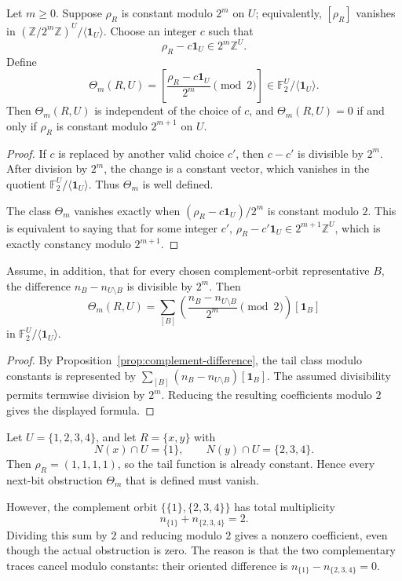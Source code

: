 \documentclass[thmsec,dntnbr,nolinenbrs]{dmgt}
\numberwithin{equation}{section}
\newcommand{\F}{\mathbb{F}}
\newcommand{\Z}{\mathbb{Z}}
\newcommand{\one}{\mathbf{1}}
\begin{document}
\begin{corollary}\label{cor:next-bit}
Let \(m\ge 0\).  Suppose \(\rho_R\) is constant modulo \(2^m\) on \(U\); equivalently, \([\rho_R]\) vanishes in \((\Z/2^m\Z)^U/\langle \one_U\rangle\).  Choose an integer \(c\) such that
\[
        \rho_R-c\one_U\in 2^m\Z^U.
\]
Define
\[
        \Theta_m(R,U)
        =\left[\frac{\rho_R-c\one_U}{2^m}\pmod 2\right]
        \in \F_2^U/\langle \one_U\rangle .
\]
Then \(\Theta_m(R,U)\) is independent of the choice of \(c\), and \(\Theta_m(R,U)=0\) if and only if \(\rho_R\) is constant modulo \(2^{m+1}\) on \(U\).
\end{corollary}

\begin{proof}
If \(c\) is replaced by another valid choice \(c'\), then \(c-c'\) is divisible by \(2^m\).  After division by \(2^m\), the change is a constant vector, which vanishes in the quotient \(\F_2^U/\langle \one_U\rangle\).  Thus \(\Theta_m\) is well defined.

The class \(\Theta_m\) vanishes exactly when \((\rho_R-c\one_U)/2^m\) is constant modulo \(2\).  This is equivalent to saying that for some integer \(c'\), \(\rho_R-c'\one_U\in 2^{m+1}\Z^U\), which is exactly constancy modulo \(2^{m+1}\).
\end{proof}

\begin{corollary}\label{cor:oriented-divisibility}
Assume, in addition, that for every chosen complement-orbit representative \(B\), the difference \(n_B-n_{U\setminus B}\) is divisible by \(2^m\).  Then
\[
        \Theta_m(R,U)
        =\sum_{[B]}\left(\frac{n_B-n_{U\setminus B}}{2^m}\pmod 2\right)[\one_B]
\]
in \(\F_2^U/\langle \one_U\rangle\).
\end{corollary}

\begin{proof}
By Proposition~\ref{prop:complement-difference}, the tail class modulo constants is represented by \(\sum_{[B]}(n_B-n_{U\setminus B})[\one_B]\).  The assumed divisibility permits termwise division by \(2^m\).  Reducing the resulting coefficients modulo \(2\) gives the displayed formula.
\end{proof}

\begin{example}\label{ex:sums-fail}
Let \(U=\{1,2,3,4\}\), and let \(R=\{x,y\}\) with
\[
        N(x)\cap U=\{1\},
        \qquad
        N(y)\cap U=\{2,3,4\}.
\]
Then \(\rho_R=(1,1,1,1)\), so the tail function is already constant.  Hence every next-bit obstruction \(\Theta_m\) that is defined must vanish.

However, the complement orbit \(\{\{1\},\{2,3,4\}\}\) has total multiplicity
\[
        n_{\{1\}}+n_{\{2,3,4\}}=2.
\]
Dividing this sum by \(2\) and reducing modulo \(2\) gives a nonzero coefficient, even though the actual obstruction is zero.  The reason is that the two complementary traces cancel modulo constants: their oriented difference is \(n_{\{1\}}-n_{\{2,3,4\}}=0\).
\end{example}
\end{document}
